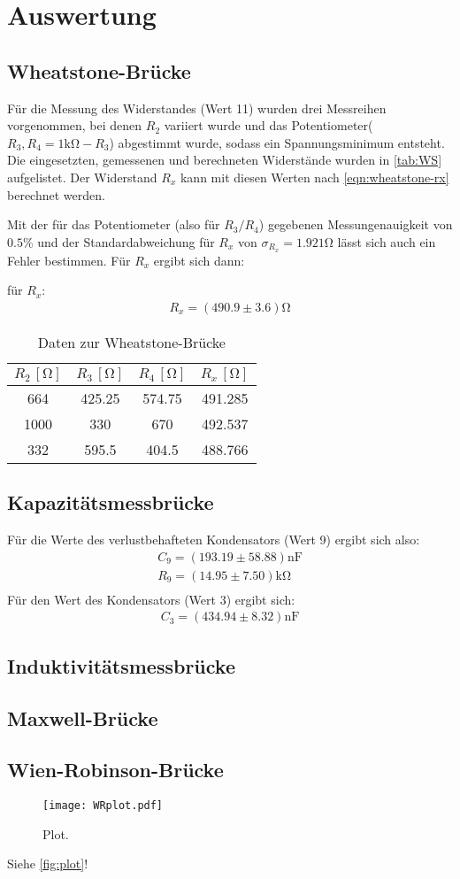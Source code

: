 \section{Auswertung}
\label{sec:Auswertung}

\subsection{Wheatstone-Brücke}
Für die Messung des Widerstandes (Wert 11) wurden drei Messreihen vorgenommen, bei denen $R_2$ variiert wurde und das Potentiometer($R_3, R_4=1\si{\kilo}\si{\ohm}-R_3$) abgestimmt wurde, sodass ein Spannungsminimum entsteht. Die eingesetzten, gemessenen und berechneten  Widerstände wurden in \autoref{tab:WS} aufgelistet. Der Widerstand $R_x$ kann mit diesen Werten nach \autoref{eqn:wheatstone-rx} berechnet werden.

Mit der für das Potentiometer (also für $R_3/R_4$) gegebenen Messungenauigkeit von $0.5\%$ und der Standardabweichung für $R_x$ von $\sigma_{R_x}=1.921 \si{\ohm}$ lässt sich auch ein Fehler bestimmen. Für $R_x$ ergibt sich dann: 

für $R_x$:
\begin{align}
  R_x=(490.9 \pm 3.6)\si{\ohm}
\end{align}

\begin{table}
  \centering
  \caption{Daten zur Wheatstone-Brücke}
  \label{tab:WS}
  \begin{tabular}{c c c c}
  \toprule
  $R_2 \, [\si{\ohm}]$ &$R_3 \, [\si{\ohm}]$ &$R_4 \, [\si{\ohm}]$ & $R_x \, [\si{\ohm}]$\\
  \midrule
   664 & 425.25 & 574.75& 491.285\\
   1000 & 330 & 670 & 492.537 \\
   332 & 595.5 & 404.5 & 488.766 \\
  \bottomrule
  \end{tabular}
\end{table}
\subsection{Kapazitätsmessbrücke}
Für die Werte des verlustbehafteten Kondensators (Wert 9) ergibt sich also:
\begin{align}
  C_9=(193.19 \pm 58.88)\si{\nano} \si{\farad}\\
  R_9=(14.95 \pm 7.50)\si{\kilo} \si{\ohm}\\
\end{align}
Für den Wert des Kondensators (Wert 3) ergibt sich:
\begin{align}
  C_3=(434.94 \pm 8.32)\si{\nano} \si{\farad}
\end{align}
\subsection{Induktivitätsmessbrücke}
\subsection{Maxwell-Brücke}
\subsection{Wien-Robinson-Brücke}
\begin{figure}
  \centering
  \texttt{[image: WRplot.pdf]}
  \caption{Plot.}
  \label{fig:plot}
\end{figure}


Siehe \autoref{fig:plot}!
